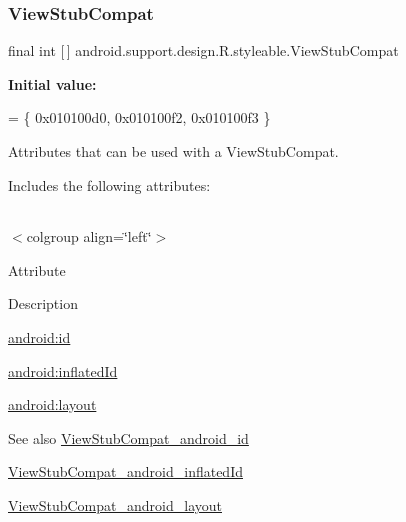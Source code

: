 \subsubsection{\texorpdfstring{View\+Stub\+Compat}{ViewStubCompat}}
{\footnotesize\ttfamily final int \mbox{[}$\,$\mbox{]} android.\+support.\+design.\+R.\+styleable.\+View\+Stub\+Compat\hspace{0.3cm}{\ttfamily [static]}}

{\bfseries Initial value\+:}
\begin{DoxyCode}
= \{
            0x010100d0, 0x010100f2, 0x010100f3
        \}
\end{DoxyCode}
Attributes that can be used with a View\+Stub\+Compat. 

Includes the following attributes\+:

\tabulinesep=1mm
\begin{longtabu} spread 0pt [c]{*{0}{|X[-1]}|}
\hline
\end{longtabu}
$<$colgroup align=\char`\"{}left\char`\"{}$>$ 

Attribute

Description 

{\ttfamily \hyperlink{classandroid_1_1support_1_1design_1_1R_1_1styleable_a38b4942d1655f9b64093db09ad074cbe}{android\+:id}}

{\ttfamily \hyperlink{classandroid_1_1support_1_1design_1_1R_1_1styleable_ab000b31614eac45930f7c4b0a8e49919}{android\+:inflated\+Id}}

{\ttfamily \hyperlink{classandroid_1_1support_1_1design_1_1R_1_1styleable_a779184c37f20616420968d01a403c746}{android\+:layout}}

\begin{DoxySeeAlso}{See also}
\hyperlink{classandroid_1_1support_1_1design_1_1R_1_1styleable_a38b4942d1655f9b64093db09ad074cbe}{View\+Stub\+Compat\+\_\+android\+\_\+id} 

\hyperlink{classandroid_1_1support_1_1design_1_1R_1_1styleable_ab000b31614eac45930f7c4b0a8e49919}{View\+Stub\+Compat\+\_\+android\+\_\+inflated\+Id} 

\hyperlink{classandroid_1_1support_1_1design_1_1R_1_1styleable_a779184c37f20616420968d01a403c746}{View\+Stub\+Compat\+\_\+android\+\_\+layout} 
\end{DoxySeeAlso}
\mbox{\label{classandroid_1_1support_1_1design_1_1R_1_1styleable_a38b4942d1655f9b64093db09ad074cbe}} 
